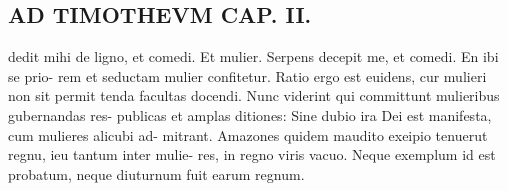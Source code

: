 \documentclass{article}
\begin{document}
\begin{pages}
\section*{AD TIMOTHEVM CAP. II. }
\marginpar{[ p.73 ]}\pstart dedit mihi de ligno, et comedi. Et mulier. Serpens decepit me, et comedi. En ibi se prio- rem et seductam mulier confitetur. Ratio ergo est euidens, cur mulieri non sit permit tenda facultas docendi. Nunc viderint qui committunt mulieribus gubernandas res- publicas et amplas ditiones: Sine dubio ira Dei est manifesta, cum mulieres alicubi ad- mitrant. Amazones quidem maudito exeipio tenuerut regnu, ieu tantum inter mulie- res, in regno viris vacuo. Neque  exemplum id est probatum, neque  diuturnum fuit earum regnum.  \pend
{}
{}

\end{pages}
\end{document}
